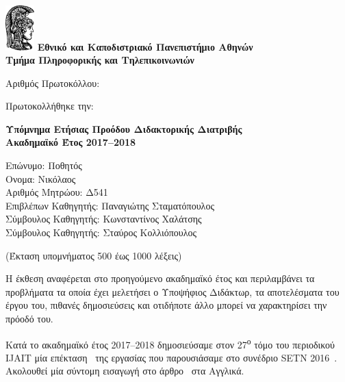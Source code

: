 \documentclass[a4paper]{article}
\begin{document}

\includegraphics[width=3em]{athena}
\textbf{Εθνικό και Καποδιστριακό Πανεπιστήμιο Αθηνών \\
        Τμήμα Πληροφορικής και Τηλεπικοινωνιών}

\vspace{1em}

\noindent
Αριθμός Πρωτοκόλλου:

\noindent
Πρωτοκολλήθηκε την:

\vspace{1.5em}

\begin{center}
  \textbf{Υπόμνημα Ετήσιας Προόδου Διδακτορικής Διατριβής \\
          Ακαδημαϊκό Έτος 2017–2018}
\end{center}

\vspace{1em}

\noindent
Επώνυμο: Ποθητός \\
Ονομα: Νικόλαος \\
Αριθμός Μητρώου: Δ541 \\
Επιβλέπων Καθηγητής: Παναγιώτης Σταματόπουλος \\
Σύμβουλος Καθηγητής: Κωνσταντίνος Χαλάτσης \\
Σύμβουλος Καθηγητής: Σταύρος Κολλιόπουλος

\begin{center}
  (Έκταση υπομνήματος 500 έως 1000 λέξεις)
\end{center}

Η έκθεση αναφέρεται στο προηγούμενο ακαδημαϊκό έτος και
περιλαμβάνει τα προβλήματα τα οποία έχει μελετήσει ο
Υποψήφιος Διδάκτωρ, τα αποτελέσματα του έργου του, πιθανές
δημοσιεύσεις και οτιδήποτε άλλο μπορεί να χαρακτηρίσει την
πρόοδό του.

\vspace{1em}

Κατά το ακαδημαϊκό έτος 2017–2018 δημοσιεύσαμε στον
27\textsuperscript{ο} τόμο του περιοδικού IJAIT μία
επέκταση~\cite{Pothitos2018} της εργασίας που παρουσιάσαμε
στο συνέδριο SETN 2016~\cite{Pothitos2016-PoPS}. Ακολουθεί
μία σύντομη εισαγωγή στο άρθρο~\cite{Pothitos2018} στα
Αγγλικά.
\end{document}
